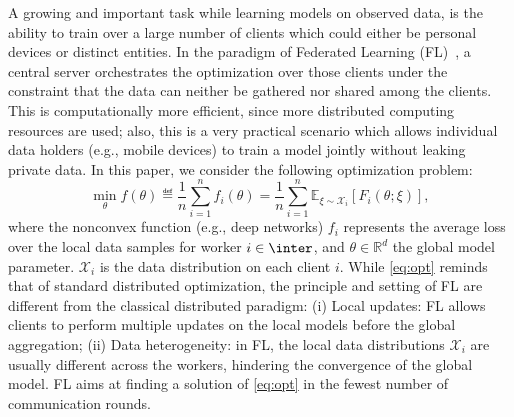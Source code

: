 \documentclass[nohyperref]{article}
\theoremstyle{plain}
\theoremstyle{definition}
\theoremstyle{remark}
\begin{document}
A growing and important task while learning models on observed data, is the ability to train over a large number of clients which could either be personal devices or distinct entities.
In the paradigm of Federated Learning (FL)~\citep{konevcny2016federated,mcmahan2017communication}, a central server orchestrates the optimization over those clients under the constraint that the data can neither be gathered nor shared among the clients.
This is computationally more efficient, since more distributed computing resources are used; also, this is a very practical scenario which allows individual data holders (e.g., mobile devices) to train a  model jointly without leaking private data. 
In this paper, we consider the following optimization problem:
\begin{equation}\label{eq:opt}
\min_{\theta} f(\theta) \eqdef \frac{1}{n} \sum_{i=1}^n f_i(\theta)= \frac{1}{n} \sum_{i=1}^n \mathbb E_{\xi\sim \mathcal X_i}[F_i(\theta;\xi)],
\end{equation}
where the nonconvex function (e.g., deep networks) $f_i$ represents the average loss over the local data samples for worker $i \in \inter$, and $\theta \in \mathbb R^d$ the global model parameter. 
$\mathcal X_i$ is the data distribution on each client $i$.
While \eqref{eq:opt} reminds that of standard distributed optimization, the principle and setting of FL are different from the classical distributed paradigm: (i) Local updates: FL allows clients to perform multiple updates on the local models before the global aggregation; (ii) Data heterogeneity: in FL, the local data distributions $\mathcal X_i$ are usually different across the workers, hindering the convergence of the global model. 
FL aims at finding a solution of \eqref{eq:opt} in the fewest number of communication rounds. 
\end{document}
